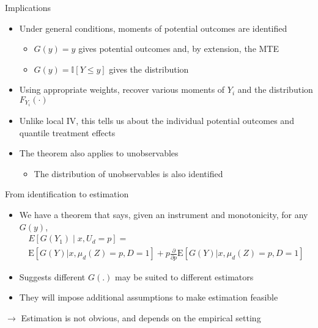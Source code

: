 \documentclass{beamer}
\newcommand{\E}{\mathrm{E}} %
\begin{document}
\begin{frame}{Implications}

\begin{itemize}

\item Under general conditions, moments of potential outcomes are
  identified
\begin{itemize}
\item $G(y) = y$ gives potential outcomes and, by extension, the MTE

\item $G(y) = \mathbb{I} \left[ Y \leq y \right]$ gives the
  distribution
\end{itemize}

\pause

\item Using appropriate weights, recover various moments of $Y_i$ and
  the distribution $F_{Y_i}(\cdot)$

\item Unlike local IV, this tells us about the individual potential
  outcomes and quantile treatment effects

\pause

\item The theorem also applies to unobservables
\begin{itemize}
\item The distribution of unobservables is also identified
\end{itemize}

\end{itemize}

\end{frame}


\begin{frame}{From identification to estimation}
  \begin{itemize}
  \item We have a theorem that says, given an instrument and monotonicity, for any $G(y)$,
    \begin{multline*}
      E[G(Y_1)\mid x, U_d=p] = \\ \E \left[ G(Y) | x, \mu_d(Z) = p, D = 1 \right] + p \frac{\partial}{\partial p} \E\left[ G(Y) |  x, \mu_d(Z) = p, D = 1 \right]
    \end{multline*}
  \item Suggests different $G(.)$ may be suited to different estimators
    \item They will impose additional assumptions to make estimation feasible
  \end{itemize}
    $\rightarrow$ Estimation is not obvious, and depends on the empirical setting


\end{frame}
\end{document}
